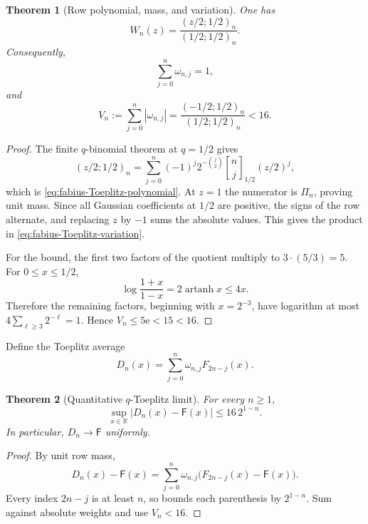 \documentclass[11pt,oneside,openany]{book}
\newtheorem{theorem}{Theorem}[chapter]
\theoremstyle{definition}
\theoremstyle{remark}
\newcommand{\Qbinom}[3]{\genfrac{[}{]}{0pt}{}{#1}{#2}_{#3}}
\newcommand{\R}{\mathbb R}
\newcommand{\e}{\mathrm e}
\newcommand{\Fab}{\mathsf F}
\begin{document}
\begin{theorem}[Row polynomial, mass, and variation]\label{thm:fabius-Toeplitz-row}
One has
\begin{equation}\label{eq:fabius-Toeplitz-polynomial}
 \boxed{W_n(z)=\frac{(z/2;1/2)_n}{(1/2;1/2)_n}.}
\end{equation}
Consequently,
\begin{equation}\label{eq:fabius-Toeplitz-mass}
 \sum_{j=0}^n\omega_{n,j}=1,
\end{equation}
and
\begin{equation}\label{eq:fabius-Toeplitz-variation}
 V_n:=\sum_{j=0}^n|\omega_{n,j}|
 =\frac{(-1/2;1/2)_n}{(1/2;1/2)_n}<16.
\end{equation}
\end{theorem}

\begin{proof}
The finite $q$-binomial theorem at $q=1/2$ gives
\[
 (z/2;1/2)_n
 =\sum_{j=0}^n(-1)^j2^{-\binom j2}\Qbinom nj{1/2}(z/2)^j,
\]
which is \eqref{eq:fabius-Toeplitz-polynomial}.  At $z=1$ the numerator is
$\Pi_n$, proving unit mass.  Since all Gaussian coefficients at $1/2$ are
positive, the signs of the row alternate, and replacing $z$ by $-1$ sums the
absolute values.  This gives the product in
\eqref{eq:fabius-Toeplitz-variation}.

For the bound, the first two factors of the quotient multiply to
$3\cdot(5/3)=5$.  For $0\le x\le1/2$,
\[
 \log\frac{1+x}{1-x}=2\operatorname{artanh}x\le4x.
\]
Therefore the remaining factors, beginning with $x=2^{-3}$, have logarithm at
most
$4\sum_{\ell\ge3}2^{-\ell}=1$.  Hence $V_n\le5\e<15<16$.
\end{proof}

Define the Toeplitz average
\begin{equation}\label{eq:fabius-Dn}
 D_n(x)=\sum_{j=0}^n\omega_{n,j}F_{2n-j}(x).
\end{equation}

\begin{theorem}[Quantitative $q$-Toeplitz limit]\label{thm:fabius-Toeplitz-limit}
For every $n\ge1$,
\begin{equation}\label{eq:fabius-Toeplitz-limit}
 \boxed{
 \sup_{x\in\R}|D_n(x)-\Fab(x)|
 \le16\,2^{1-n}.}
\end{equation}
In particular, $D_n\to\Fab$ uniformly.
\end{theorem}

\begin{proof}
By unit row mass,
\[
 D_n(x)-\Fab(x)=\sum_{j=0}^n\omega_{n,j}
  \bigl(F_{2n-j}(x)-\Fab(x)\bigr).
\]
Every index $2n-j$ is at least $n$, so
 bounds each parenthesis by
$2^{1-n}$.  Sum against absolute weights and use $V_n<16$.
\end{proof}
\end{document}
